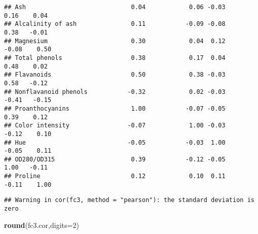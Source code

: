 \documentclass[
]{article}
\newenvironment{Shaded}{\begin{snugshade}}{\end{snugshade}}
\newcommand{\CommentTok}[1]{\textcolor[rgb]{0.56,0.35,0.01}{\textit{#1}}}
\newcommand{\DataTypeTok}[1]{\textcolor[rgb]{0.13,0.29,0.53}{#1}}
\newcommand{\DecValTok}[1]{\textcolor[rgb]{0.00,0.00,0.81}{#1}}
\newcommand{\KeywordTok}[1]{\textcolor[rgb]{0.13,0.29,0.53}{\textbf{#1}}}
\newcommand{\NormalTok}[1]{#1}
\newcommand{\StringTok}[1]{\textcolor[rgb]{0.31,0.60,0.02}{#1}}
\begin{document}
\begin{verbatim}
## Ash                             0.04            0.06 -0.03        0.16    0.04
## Alcalinity of ash               0.11           -0.09 -0.08        0.38   -0.01
## Magnesium                       0.30            0.04  0.12       -0.08    0.50
## Total phenols                   0.38            0.17  0.04        0.48    0.02
## Flavanoids                      0.50            0.38 -0.03        0.58   -0.12
## Nonflavanoid phenols           -0.32            0.02 -0.03       -0.41   -0.15
## Proanthocyanins                 1.00           -0.07 -0.05        0.39    0.12
## Color intensity                -0.07            1.00 -0.03       -0.12    0.10
## Hue                            -0.05           -0.03  1.00       -0.05    0.11
## OD280/OD315                     0.39           -0.12 -0.05        1.00   -0.11
## Proline                         0.12            0.10  0.11       -0.11    1.00
\end{verbatim}

\begin{Shaded}
\end{Shaded}

\begin{verbatim}
## Warning in cor(fc3, method = "pearson"): the standard deviation is zero
\end{verbatim}

\begin{Shaded}
\begin{Highlighting}[]
\KeywordTok{round}\NormalTok{(fc3.cor,}\DataTypeTok{digits=}\DecValTok{2}\NormalTok{)}
\end{Highlighting}
\end{Shaded}
\end{document}
